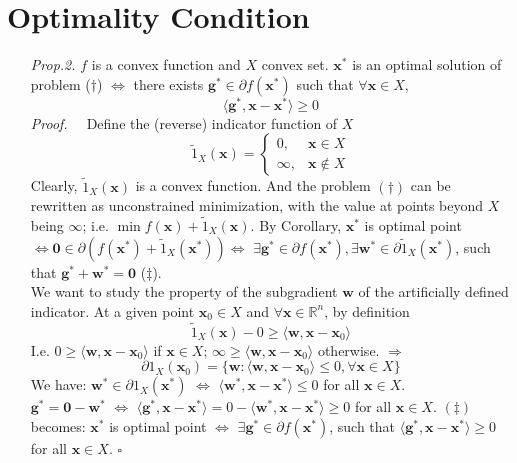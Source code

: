 \documentclass[a4paper, 11pt]{book}
\begin{document}
\section{Optimality Condition}
\begin{itemize}
  \item[\textit{Prop.2.}] $f$ is a convex function and $X$ convex set. $\bm{x}^*$ is an optimal solution of problem ($\dag$) $\iff$ there exists $\bm{g}^* \in \partial f(\bm{x}^*)$ such that $\forall \bm{x}\in X$,
  \begin{equation}\label{eq:opt1}
    \langle \bm{g}^*, \bm{x-x}^* \rangle \geq 0
  \end{equation}
  \textit{Proof.~~} Define the (reverse) indicator function of $X$
  \begin{equation}
    \tilde{1}_X (\bm{x}) = \begin{cases}
    0, &\bm{x}\in X\\
    \infty, &\bm{x} \notin X
    \end{cases}
  \end{equation}
  Clearly, $\tilde{1}_X (\bm{x})$ is a convex function. And the problem $(\dag)$ can be rewritten as unconstrained minimization, with the value at points beyond $X$ being $\infty$; i.e. $\min f(\bm{x}) + \tilde{1}_X (\bm{x})$. By Corollary, $\bm{x}^*$ is optimal point $\iff \bm{0} \in \partial (f(\bm{x}^*)+\tilde{1}_X(\bm{x}^*)) \iff$ $\exists \bm{g}^*\in \partial f(\bm{x}^*), \exists \bm{w}^*\in \partial \tilde{1}_X(\bm{x}^*)$, such that $\bm{g}^*+\bm{w}^*=\bm{0}$ ($\ddag$).\\

  We want to study the property of the subgradient $\bm{w}$ of the artificially defined indicator. At a given point $\bm{x}_0 \in X$ and $\forall \bm{x}\in \mathbb{R}^n$, by definition
  $$
  \tilde{1}_X (\bm{x}) - 0 \geq \langle \bm{w}, \bm{x-x}_0 \rangle
  $$
  I.e. $0 \geq \langle \bm{w}, \bm{x-x}_0 \rangle$ if $\bm{x}\in X$; $\infty \geq \langle \bm{w}, \bm{x-x}_0 \rangle$ otherwise. $\Rightarrow$ 
  $$
  \partial 1_X(\bm{x}_0) = \{\bm{w}:  \langle \bm{w}, \bm{x-x}_0 \rangle \leq 0, \forall \bm{x}\in X\}$$
  We have: $\bm{w}^* \in \partial 1_X(\bm{x}^*)$ $\iff$ $\langle \bm{w}^*, \bm{x-x}^* \rangle \leq 0$ for all $\bm{x}\in X$. \\
  $\bm{g}^* = \bm{0} - \bm{w}^*$ $\iff$ $\langle \bm{g}^*, \bm{x-x}^* \rangle = 0 - \langle \bm{w}^*, \bm{x-x}^* \rangle \geq 0$ for all $\bm{x}\in X$. $(\ddag)$ becomes: $\bm{x}^*$ is optimal point $\iff$ $\exists \bm{g}^*\in \partial f(\bm{x}^*)$, such that $\langle \bm{g}^*, \bm{x-x}^* \rangle \geq 0$ for all $\bm{x}\in X$. $\square$
\end{itemize}
\end{document}
